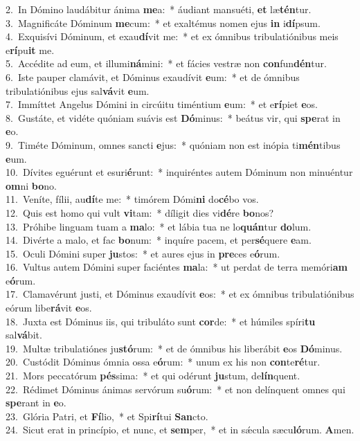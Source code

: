 {2.~}In Dómino laudábitur ánima \textbf{me}a:~* áudiant mansuéti, \textbf{et} læ\textbf{tén}tur.\\
{3.~}Magnificáte Dóminum \textbf{me}cum:~* et exaltémus nomen ejus \textbf{in} i\textbf{dí}psum.\\
{4.~}Exquisívi Dóminum, et exau\textbf{dí}vit me:~* et ex ómnibus tribulatiónibus meis e\textbf{rí}pu\textbf{it} me.\\
{5.~}Accédite ad eum, et illumi\textbf{ná}mini:~* et fácies vestræ non \textbf{con}fun\textbf{dén}tur.\\
{6.~}Iste pauper clamávit, et Dóminus exaudívit \textbf{e}um:~* et de ómnibus tribulatiónibus ejus sal\textbf{vá}vit \textbf{e}um.\\
{7.~}Immíttet Angelus Dómini in circúitu timéntium \textbf{e}um:~* et e\textbf{rí}piet \textbf{e}os.\\
{8.~}Gustáte, et vidéte quóniam suávis est \textbf{Dó}minus:~* beátus vir, qui \textbf{spe}rat in \textbf{e}o.\\
{9.~}Timéte Dóminum, omnes sancti \textbf{e}jus:~* quóniam non est inópia ti\textbf{mén}tibus \textbf{e}um.\\
{10.~}Dívites eguérunt et esuri\textbf{é}runt:~* inquiréntes autem Dóminum non minuéntur \textbf{om}ni \textbf{bo}no.\\
{11.~}Veníte, fílii, au\textbf{dí}te me:~* timórem Dómi\textbf{ni} do\textbf{cé}bo vos.\\
{12.~}Quis est homo qui vult \textbf{vi}tam:~* díligit dies vi\textbf{dé}re \textbf{bo}nos?\\
{13.~}Próhibe linguam tuam a \textbf{ma}lo:~* et lábia tua ne lo\textbf{quán}tur \textbf{do}lum.\\
{14.~}Divérte a malo, et fac \textbf{bo}num:~* inquíre pacem, et per\textbf{sé}quere \textbf{e}am.\\
{15.~}Oculi Dómini super \textbf{ju}stos:~* et aures ejus in \textbf{pre}ces e\textbf{ó}rum.\\
{16.~}Vultus autem Dómini super faciéntes \textbf{ma}la:~* ut perdat de terra memóri\textbf{am} e\textbf{ó}rum.\\
{17.~}Clamavérunt justi, et Dóminus exaudívit \textbf{e}os:~* et ex ómnibus tribulatiónibus eórum libe\textbf{rá}vit \textbf{e}os.\\
{18.~}Juxta est Dóminus iis, qui tribuláto sunt \textbf{cor}de:~* et húmiles spíri\textbf{tu} sal\textbf{vá}bit.\\
{19.~}Multæ tribulatiónes ju\textbf{stó}rum:~* et de ómnibus his liberábit \textbf{e}os \textbf{Dó}minus.\\
{20.~}Custódit Dóminus ómnia ossa e\textbf{ó}rum:~* unum ex his non \textbf{con}te\textbf{ré}tur.\\
{21.~}Mors peccatórum \textbf{pés}sima:~* et qui odérunt \textbf{ju}stum, de\textbf{lín}quent.\\
{22.~}Rédimet Dóminus ánimas servórum su\textbf{ó}rum:~* et non delínquent omnes qui \textbf{spe}rant in \textbf{e}o.\\
{23.~}Glória Patri, et \textbf{Fí}lio,~* et Spi\textbf{rí}tui \textbf{San}cto.\\
{24.~}Sicut erat in princípio, et nunc, et \textbf{sem}per,~* et in sǽcula sæcu\textbf{ló}rum. \textbf{A}men.\\
